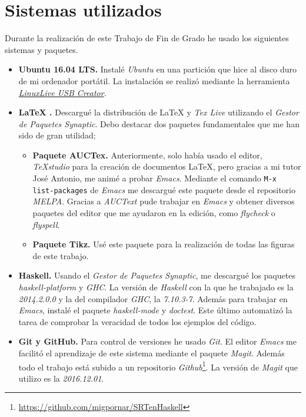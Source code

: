 \chapter*{Sistemas utilizados}

Durante la realización de este Trabajo de Fin de Grado he usado los
siguientes sistemas y paquetes. 

\begin{itemize}
\item \textbf{Ubuntu 16.04 LTS.} Instalé \textit{Ubuntu} en una
  partición que hice al disco duro de mi ordenador portátil. La
  instalación se realizó mediante la herramienta
  \href{http://www.linuxliveusb.com/} {\textit{LinuxLive USB
      Creator}}. 

\item \textbf{\LaTeX{} .} Descargué la distribución de \LaTeX{} y
  \textit{Tex Live} utilizando el \textit{Gestor de Paquetes
    Synaptic}. Debo destacar dos paquetes fundamentales que me han
  sido de gran utilidad;
  \begin{itemize}
  \item \textbf{Paquete AUCTex.} Anteriormente, solo había usado el
    editor, \textit{TeXstudio} para la creación de documentos
    \LaTeX{}, pero gracias a mi tutor José Antonio, me animé a probar
    \textit{Emacs}. Mediante el comando \texttt{M-x list-packages} de
    \textit{Emacs} me descargué este paquete desde el repositorio
    \textit{MELPA}. Gracias a \textit{AUCText} pude trabajar en
    \textit{Emacs} y obtener diversos paquetes del editor que me
    ayudaron en la edición, como \textit{flycheck} o
    \textit{flyspell}.

  \item \textbf{Paquete Tikz.} Usé este paquete para la realización de
    todas las figuras de este trabajo.
      
  \end{itemize}
 
\item \textbf{Haskell.} Usando el \textit{Gestor de Paquetes
    Synaptic}, me descargué los paquetes \textit{haskell-platform} y
  \textit{GHC}. La versión de \textit{Haskell} con la que he trabajado
  es la \textit{2014.2.0.0} y la del compilador \textit{GHC}, la
  \textit{7.10.3-7}. Además para trabajar en \textit{Emacs}, instalé
  el paquete \textit{haskell-mode} y \textit{doctest}. Este último
  automatizó la tarea de comprobar la veracidad de todos los ejemplos
  del código.

\item \textbf{Git y GitHub.} Para control de versiones he usado
  \textit{Git}. El editor \textit{Emacs} me facilitó el aprendizaje de
  este sistema mediante el paquete \textit{Magit}. Además todo el
  trabajo está subido a un repositorio
  \textit{Github}\footnote{\href{https://github.com/migpornar/SRTenHaskell}{https://github.com/migpornar/SRTenHaskell}}. La
  versión de \textit{Magit} que utilizo es la \textit{2016.12.01}.
  \end{itemize}

  

\clearpage
\addappheadtotoc
\appendix


